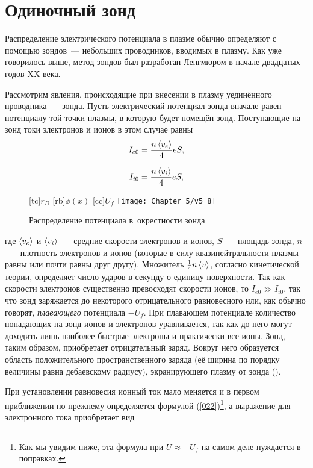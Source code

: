 \section{Одиночный зонд}

Распределение электрического потенциала в плазме обычно определяют с помощью зондов~--- небольших проводников, вводимых в
плазму. Как уже говорилось выше, метод зондов был разработан Ленгмюром в начале двадцатых годов XX века.

Рассмотрим явления, происходящие при внесении в плазму уединённого проводника~--- зонда. Пусть электрический потенциал
зонда вначале равен потенциалу той точки плазмы, в которую будет помещён зонд. Поступающие на зонд токи электронов и
ионов в этом случае равны
\begin{equation}
	\eqmark[021]
	I_{e0}=\frac{n\average{v_e}}{4}eS,
\end{equation}

\begin{equation}
	\eqmark[022]
	I_{i0}=\frac{n\average{v_i}}{4}eS,
\end{equation}


\begin{wrapfigure}{o}{0.5\textwidth}
	[tc]{$r_D$}
	[rb]{$\phi(x)$}
	[cc]{$U_f$}
	\texttt{[image: Chapter\_5/v5\_8]}
	\caption{Распределение потенциала в~окрестности зонда}
	\figmark[8]
\end{wrapfigure}

где $\left< v_e \right>$ и $\left< v_i \right>$~--- средние скорости электронов и ионов, $S$~--- площадь зонда, $n$~--- плотность
электронов и ионов (которые в силу квазинейтральности плазмы равны или почти равны друг другу). Множитель $\frac14
n\left< v \right>$, согласно кинетической теории, определяет число ударов в секунду о единицу поверхности. Так как скорости
электронов существенно превосходят скорости ионов, то $I_{e0}\gg I_{i0}$, так что зонд заряжается до некоторого
отрицательного равновесного или, как обычно говорят, \textit{плавающего} потенциала $-U_f$. При плавающем потенциале
количество попадающих на зонд ионов и электронов уравнивается, так как до него могут доходить лишь наиболее быстрые
электроны и практически все ионы. Зонд, таким образом, приобретает отрицательный заряд. Вокруг него образуется область
положительного пространственного заряда (её ширина по порядку величины равна дебаевскому радиусу), экранирующего плазму
от зонда ().

При установлении равновесия ионный ток мало меняется и в первом приближении по-прежнему определяется формулой
(\eqref{022})\footnote{Как мы увидим ниже, эта формула при $U\approx -U_f$ на самом деле нуждается в поправках.}, а
выражение для электронного тока приобретает вид


